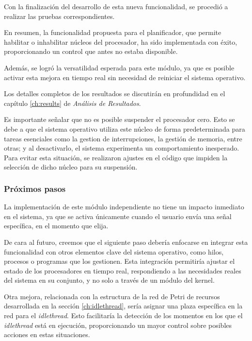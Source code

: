 Con la finalización del desarrollo de esta nueva funcionalidad, se procedió a realizar las pruebas correspondientes.\par

En resumen, la funcionalidad propuesta para el planificador, que permite habilitar o inhabilitar núcleos del procesador, ha sido implementada con éxito, proporcionando un control que antes no estaba disponible.\par

Además, se logró la versatilidad esperada para este módulo, ya que es posible activar esta mejora en tiempo real sin necesidad de reiniciar el sistema operativo.\par

Los detalles completos de los resultados se discutirán en profundidad en el capítulo \ref{ch:results} de \textit{Análisis de Resultados}.\par

Es importante señalar que no es posible suspender el procesador cero. Esto se debe a que el sistema operativo utiliza este núcleo de forma predeterminada para tareas esenciales como la gestion de interrupciones, la gestión de memoria, entre otras; y al desactivarlo, el sistema experimenta un comportamiento inesperado. Para evitar esta situación, se realizaron ajustes en el código que impiden la selección de dicho núcleo para su suspensión.\par

\subsubsection{Próximos pasos}

La implementación de este módulo independiente no tiene un impacto inmediato en el sistema, ya que se activa únicamente cuando el usuario envía una señal específica, en el momento que elija.\par

De cara al futuro, creemos que el siguiente paso debería enfocarse en integrar esta funcionalidad con otros elementos clave del sistema operativo, como hilos, procesos o programas que los gestionen. Esta integración permitiría ajustar el estado de los procesadores en tiempo real, respondiendo a las necesidades reales del sistema en su conjunto, y no solo a través de un módulo del kernel.\par

Otra mejora, relacionada con la estructura de la red de Petri de recursos desarrollada en la sección \ref{ch:idlethread}, sería asignar una plaza específica en la red para el \textit{idlethread}. Esto facilitaría la detección de los momentos en los que el \textit{idlethread} está en ejecución, proporcionando un mayor control sobre posibles acciones en estas situaciones.